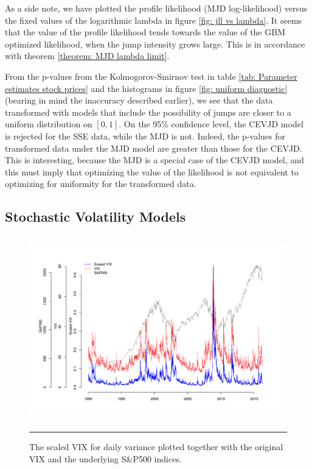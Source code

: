 	As a side note, we have plotted the profile likelihood (MJD log-likelihood) %
	versus the fixed values of the logarithmic lambda in figure \ref{fig: jll vs lambda}. 
	It seems that the value of the profile likelihood tends towards the value of the GBM optimized likelihood, when the jump intensity grows large. This is in accordance with theorem \ref{theorem: MJD lambda limit}.
	
	From the p-values from the Kolmogorov-Smirnov test in table \ref{tab: Parameter estimates stock prices} and the histograms in figure \ref{fig: uniform diagnostic} (bearing in mind the inaccuracy described earlier), we see that
	the data transformed with models that include the possibility of jumps are closer to a uniform distribution on $[0,1]$.
	On the 95\% confidence level, the CEVJD model is rejected for the SSE data, while the MJD is not.
	Indeed, the p-values for transformed data under the MJD model are greater than those for the CEVJD.
	This is interesting, because the MJD is a special case of the CEVJD model, and this must imply that optimizing the value of the likelihood is not equivalent to optimizing for uniformity for the transformed data. 
	
	
	\subsection{Stochastic Volatility Models}
	
	\begin{figure}[htbp]
		\centering
		\includegraphics[width=15cm,height=8cm]{./Figures/vixSP.pdf}
		\rule{35em}{0.5pt}
		\caption[The scaled VIX for daily variance]{The scaled VIX for daily variance plotted together with the original VIX and the underlying S\&P500 indices.}
		\label{fig:vix}
	\end{figure}
	
